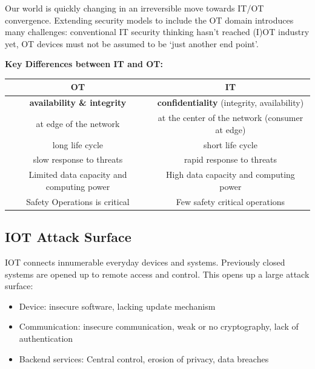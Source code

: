 \documentclass[11pt,oneside,a4paper]{article}
\begin{document}
\noindent Our world is quickly changing in an irreversible move towards IT/OT convergence. Extending security models to include the OT domain introduces many challenges: conventional IT security thinking hasn't reached (I)OT industry yet, OT devices must not be assumed to be ‘just another end point’.

\noindent \textbf{Key Differences between IT and OT:}

\begin{tabular}{|c|c|}
	\hline 
	OT& IT \\ 
	\hline 
	\textbf{availability \& integrity} & \textbf{confidentiality} (integrity, availability)  \\ 
	at edge of the network & at the center of the network (consumer at edge) \\
	long life cycle & short life cycle \\
	slow response to threats & rapid response to threats \\
	Limited data capacity and computing power & High data capacity and computing power \\
	Safety Operations is critical & Few safety critical operations \\
	\hline 
\end{tabular} 

\subsection{IOT	Attack Surface}

IOT connects innumerable everyday devices and systems. Previously closed systems are opened up to remote access and control. This opens up a large attack surface:

\vspace{-\topsep}
\begin{itemize}
	\setlength{\itemsep}{0pt}
	\setlength{\parskip}{0pt}
	\item Device: insecure software, lacking update mechanism
	\item Communication: insecure communication, weak or no cryptography, lack of authentication
	\item Backend services: Central control, erosion of privacy, data breaches
\end{itemize}
\vspace{-\topsep}
\end{document}
